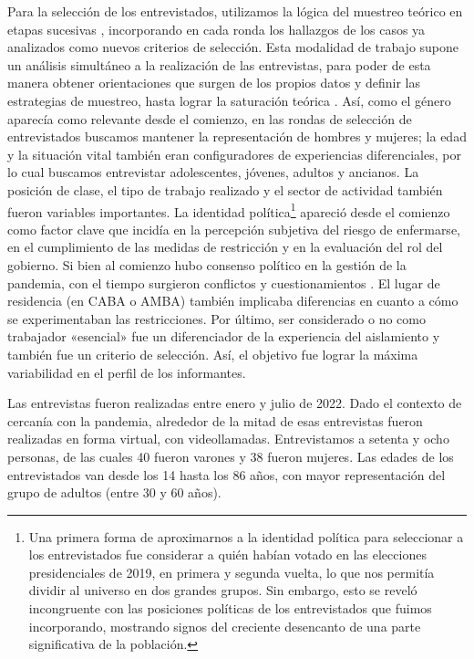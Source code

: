 \begin{refsection}
Para la selección de los entrevistados, utilizamos la lógica del muestreo teórico en etapas sucesivas \protect\parencite{4167-RAPLEY2014}, incorporando en cada ronda los hallazgos de los casos ya analizados como nuevos criterios de selección. Esta modalidad de trabajo supone un análisis simultáneo a la realización de las entrevistas, para poder de esta manera obtener orientaciones que surgen de los propios datos y definir las estrategias de muestreo, hasta lograr la saturación teórica \protect\parencite{4180-CHARMAZ2006}. Así, como el género aparecía como relevante desde el comienzo, en las rondas de selección de entrevistados buscamos mantener la representación de hombres y mujeres; la edad y la situación vital también eran configuradores de experiencias diferenciales, por lo cual buscamos entrevistar adolescentes, jóvenes, adultos y ancianos. La posición de clase, el tipo de trabajo realizado y el sector de actividad también fueron variables importantes. La identidad política\footnote{Una primera forma de aproximarnos a la identidad política para
      seleccionar a los entrevistados fue considerar a quién habían votado
      en las elecciones presidenciales de 2019, en primera y segunda vuelta,
      lo que nos permitía dividir al universo en dos grandes grupos. Sin
      embargo, esto se reveló incongruente con las posiciones políticas de
      los entrevistados que fuimos incorporando, mostrando signos del
      creciente desencanto de una parte significativa de la población.} apareció desde el comienzo como factor clave que incidía en la percepción subjetiva del riesgo de enfermarse, en el cumplimiento de las medidas de restricción y en la evaluación del rol del gobierno. Si bien al comienzo hubo consenso político en la gestión de la pandemia, con el tiempo surgieron conflictos y cuestionamientos \protect\parencite{4302-SPOLITA2022}. El lugar de residencia (en CABA o AMBA) también implicaba diferencias en cuanto a cómo se experimentaban las restricciones. Por último, ser considerado o no como trabajador «esencial» fue un diferenciador de la experiencia del aislamiento y también fue un criterio de selección. Así, el objetivo fue lograr la máxima variabilidad en el perfil de los informantes.

Las entrevistas fueron realizadas entre enero y julio de 2022. Dado el contexto de cercanía con la pandemia, alrededor de la mitad de esas entrevistas fueron realizadas en forma virtual, con videollamadas. Entrevistamos a setenta y ocho personas, de las cuales 40 fueron varones y 38 fueron mujeres. Las edades de los entrevistados van desde los 14 hasta los 86 años, con mayor representación del grupo de adultos (entre 30 y 60 años).


\end{refsection}
